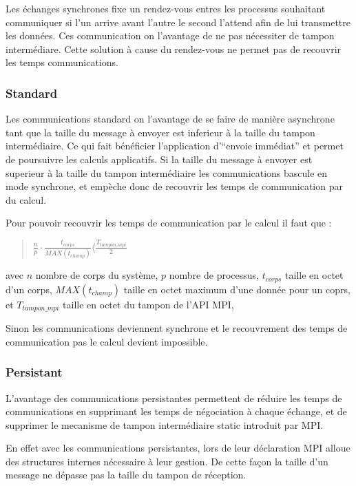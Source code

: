\par Les échanges synchrones fixe un rendez-vous entres les  processus souhaitant communiquer
si l'un arrive avant l'autre le second l'attend afin de lui transmettre les données. 
Ces communication on l'avantage de ne pas nécessiter de tampon intermédiare.
Cette solution à cause du rendez-vous ne permet pas de recouvrir les temps communications.\\

\subsubsection{Standard}

\par Les communications standard on l'avantage de se faire de manière asynchrone tant que 
la taille du message à envoyer est inferieur à la taille du tampon intermédiaire. Ce qui 
fait bénéficier l'application d'``envoie immédiat'' et permet de poursuivre les calculs
applicatifs. Si la taille du message à envoyer est superieur à la taille du tampon
intermédiaire les communications bascule en mode synchrone, et empèche donc de 
recouvrir les temps de communication par du calcul.\\

\par Pour pouvoir recouvrir les temps de communication par le calcul il faut que :
\begin{quote}
  \begin{center}
    $\frac{n}{p}\cdot \frac{t_{corps}}{MAX(t_{champ})} \langle \frac{T_{tampon\_mpi}}{2}$    
  \end{center}
\end{quote}
avec $n$ nombre de corps du système, $p$ nombre de processus, $t_{corps}$ taille en octet d'un corps,
$MAX(t_{champ})$ taille en octet maximum d'une donnée pour un coprs,
et $T_{tampon\_mpi}$ taille en octet du tampon de l'API MPI,\\

\par Sinon les communications deviennent synchrone et le recouvrement des temps de 
communication pas le calcul devient impossible.\\

\subsubsection{Persistant}

\par L'avantage des communications persistantes permettent de réduire les temps de
communications en supprimant les temps de négociation à chaque échange, et de supprimer 
le mecanisme de tampon intermédiaire static introduit par MPI.\\
\par En effet avec les communications persistantes, lors de leur déclaration MPI alloue
des structures internes nécessaire à leur gestion. De cette façon la taille d'un message 
ne dépasse pas la taille du tampon de réception.\\

